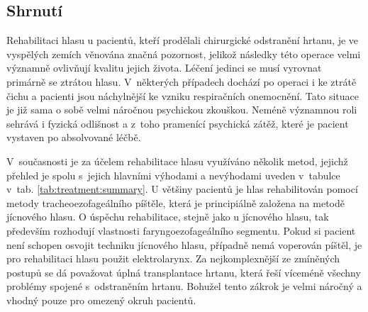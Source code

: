 %


\subsection{Shrnutí} %


Rehabilitaci hlasu u pacientů, kteří prodělali chirurgické odstranění hrtanu, je ve
vyspělých zemích věnována značná pozornost, jelikož následky této operace velmi významně ovlivňují kvalitu jejich života. Léčení jedinci se musí vyrovnat primárně se ztrátou hlasu. V~některých případech dochází po operaci i ke ztrátě čichu a pacienti jsou náchylnější ke vzniku respiračních onemocnění.
Tato situace je již sama o sobě velmi náročnou psychickou zkouškou. Neméně významnou
roli sehrává i fyzická odlišnost a z~toho pramenící psychická zátěž, které je pacient vystaven
po absolvované léčbě.

 V~současnosti je za účelem rehabilitace hlasu využíváno několik metod, jejichž přehled je spolu s~jejich hlavními výhodami a nevýhodami uveden v~tabulce v~tab. \ref{tab:treatment:summary}.
U většiny pacientů je hlas rehabilitován pomocí metody tracheoezofageálního píštěle,
která je principiálně založena na metodě jícnového hlasu. O úspěchu rehabilitace, stejně jako u jícnového hlasu, tak
především rozhodují vlastnosti faryngoezofageálního segmentu. Pokud si pacient
není schopen osvojit techniku jícnového hlasu, případně nemá voperován píštěl, je
pro rehabilitaci hlasu použit elektrolarynx. Za nejkomplexnější ze zmíněných postupů se dá považovat úplná transplantace hrtanu, která
řeší víceméně všechny problémy spojené s~odstraněním hrtanu. Bohužel tento
zákrok je velmi náročný a vhodný pouze pro omezený okruh pacientů.

